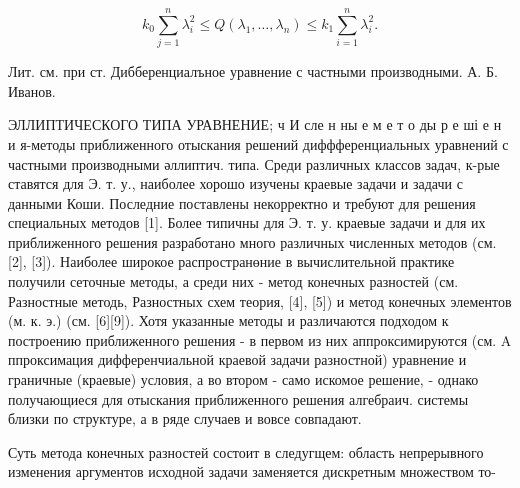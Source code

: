\documentclass[10pt]{article}
\begin{document}
\[

k_{0} \sum_{j=1}^{n} \lambda_{i}^{2} \leqslant Q\left(\lambda_{1}, \ldots, \lambda_{n}\right) \leqslant k_{1} \sum_{i=1}^{n} \lambda_{i}^{2} .

\]



Лит. см. при ст. Дибберенциалъное уравнение с частными производными. А. Б. Иванов.



ЭЛЛИПТИЧЕСКОГО ТИПА УРАВНЕНИЕ; ч И сле н ны е м е т о ды р е ші е н и я-методы приближенного отыскания решений диффференциальных уравнений с частными производными әллиптич. типа. Среди различных классов задач, к-рые ставятся для Э. т. у., наиболее хорошо изучены краевые задачи и задачи с данными Коши. Последние поставлены некорректно и требуют для решения специальных методов [1]. Более типичны для Э. т. у. краевые задачи и для их приближенного решения разработано много различных численных методов (см. [2], [3]). Наиболее широкое распространөние в вычислительной практике получили сеточные методы, а среди них - метод конечных разностей (см. Разностные методь, Разностных схем теория, [4], [5]) и метод конечных элементов (м. к. э.) (см. [6][9]). Хотя указанные методы и различаются подходом к построению приближенного решения - в первом из них аппроксимируются (см. A ппроксимация дифференчиальной краевой задачи разностной) уравнение и граничные (краевые) условия, а во втором - само искомое решение, - однако получающиеся для отыскания приближенного решения алгебраич. системы близки по структуре, а в ряде случаев и вовсе совпадают.



Суть метода конечных разностей состоит в следугщем: область непрерывного изменения аргументов исходной задачи заменяется дискретным множеством то-
\end{document}
